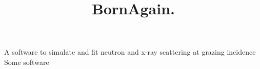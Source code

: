 \documentclass[a4paper,10pt]{article}
\title{BornAgain. }
\author{}
\begin{document}
A software to simulate and fit neutron and x-ray scattering at grazing incidence
Some software







\end{document}
